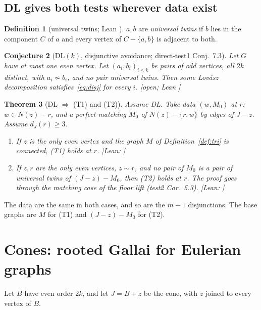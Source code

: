 \documentclass[11pt]{amsart}
\newtheorem{theorem}{Theorem}[section]
\newtheorem{conjecture}[theorem]{Conjecture}
\theoremstyle{definition}
\newtheorem{definition}[theorem]{Definition}
\newcommand{\st}[1]{\textsf{\small[#1]}}
\begin{document}
\subsection{DL gives both tests wherever data exist}

\begin{definition}[universal twins; Lean ]
$a,b$ are \emph{universal twins} if $b$ lies in the component $C$ of $a$ and every vertex of
$C-\{a,b\}$ is adjacent to both.
\end{definition}

\begin{conjecture}[DL$(k)$, disjunctive avoidance; direct-test1 Conj.~7.3]\label{conj:dl}
Let $G$ have at most one even vertex. Let $(a_i,b_i)_{i\le k}$ be pairs of odd vertices, all $2k$
distinct, with $a_i\not\sim b_i$, and no pair universal twins. Then some Lov\'asz decomposition
satisfies~\eqref{eq:disj} for every $i$. \st{open; Lean }
\end{conjecture}

\begin{theorem}[DL $\Rightarrow$ (T1) and (T2)]\label{thm:dlboth}
Assume DL. Take data $(w,M_0)$ at $r$: $w\in N(z)-r$, and a perfect matching $M_0$ of $N(z)-\{r,w\}$ by
edges of $J-z$. Assume $d_J(r)\ge3$.
\begin{enumerate}[label=(\alph*)]
\item If $z$ is the only even vertex and the graph $M$ of Definition~\ref{def:tri} is connected, (T1)
holds at $r$. \st{Lean: }
\item If $z,r$ are the only even vertices, $z\sim r$, and no pair of $M_0$ is a pair of universal twins
of $(J-z)-M_0$, then (T2) holds at $r$. The proof goes through the matching case of the floor lift
(test2 Cor.~5.3). \st{Lean: }
\end{enumerate}
\end{theorem}

The data are the same in both cases, and so are the $m-1$ disjunctions. The base graphs are $M$ for
(T1) and $(J-z)-M_0$ for (T2).

\section{Cones: rooted Gallai for Eulerian graphs}\label{sec:cones}

Let $B$ have even order $2k$, and let $J=B+z$ be the cone, with $z$ joined to every vertex of $B$.
\end{document}
